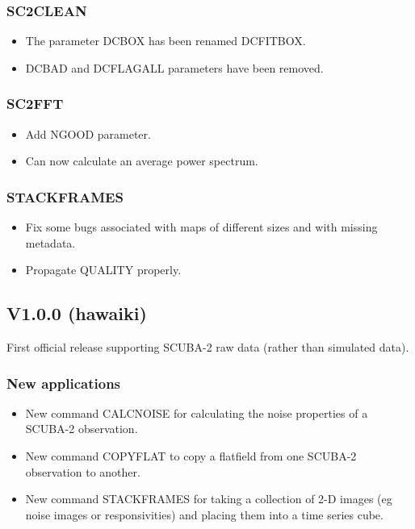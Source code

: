 \documentclass[twoside,11pt]{article}
\renewcommand{\_}{\texttt{\symbol{95}}}
\begin{document}
\subsubsection{SC2CLEAN}

\begin{itemize}
\item The parameter DCBOX has been renamed DCFITBOX.
\item DCBAD and DCFLAGALL parameters have been removed.
\end{itemize}

\subsubsection{SC2FFT}

\begin{itemize}
\item Add NGOOD parameter.
\item Can now calculate an average power spectrum.
\end{itemize}

\subsubsection{STACKFRAMES}

\begin{itemize}
\item Fix some bugs associated with maps of different sizes and with
  missing metadata.
\item Propagate QUALITY properly.
\end{itemize}

\subsection{V1.0.0 (hawaiki)}

First official release supporting SCUBA-2 raw data (rather than simulated data).

\subsubsection*{New applications}
\begin{itemize}
\item New command CALCNOISE for calculating the noise properties of a SCUBA-2 observation.
\item New command COPYFLAT to copy a flatfield from one SCUBA-2 observation to another.
\item New command STACKFRAMES for taking a collection of 2-D images
  (eg noise images or responsivities) and placing them into a time
  series cube.
\end{itemize}
\end{document}
